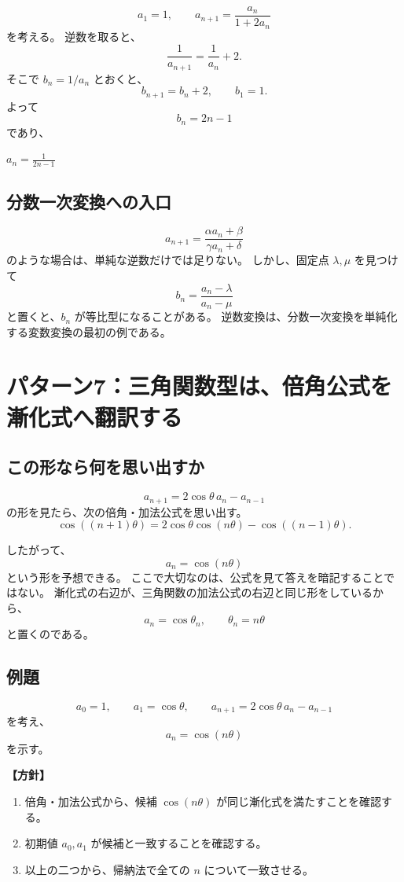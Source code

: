 \[
  a_1=1,\qquad
  a_{n+1}=\frac{a_n}{1+2a_n}
\]
を考える。
逆数を取ると、
\[
  \frac1{a_{n+1}}
  =\frac1{a_n}+2.
\]
そこで $b_n=1/a_n$ とおくと、
\[
  b_{n+1}=b_n+2,\qquad b_1=1.
\]
よって
\[
  b_n=2n-1
\]
であり、
\begin{mdquote}
  $a_n=\frac1{2n-1}$
\end{mdquote}

\subsection{分数一次変換への入口}

\[
  a_{n+1}=\frac{\alpha a_n+\beta}{\gamma a_n+\delta}
\]
のような場合は、単純な逆数だけでは足りない。
しかし、固定点 $\lambda,\mu$ を見つけて
\[
  b_n=\frac{a_n-\lambda}{a_n-\mu}
\]
と置くと、$b_n$ が等比型になることがある。
逆数変換は、分数一次変換を単純化する変数変換の最初の例である。

\section{パターン7：三角関数型は、倍角公式を漸化式へ翻訳する}

\subsection{この形なら何を思い出すか}

\[
  a_{n+1}=2\cos\theta\,a_n-a_{n-1}
\]
の形を見たら、次の倍角・加法公式を思い出す。
\[
  \cos((n+1)\theta)
  =2\cos\theta\cos(n\theta)-\cos((n-1)\theta).
\]

したがって、
\[
  a_n=\cos(n\theta)
\]
という形を予想できる。
ここで大切なのは、公式を見て答えを暗記することではない。
漸化式の右辺が、三角関数の加法公式の右辺と同じ形をしているから、
\[
  a_n=\cos\theta_n,\qquad \theta_n=n\theta
\]
と置くのである。

\subsection{例題}

\[
  a_0=1,\qquad a_1=\cos\theta,\qquad
  a_{n+1}=2\cos\theta\,a_n-a_{n-1}
\]
を考え、
\[
  a_n=\cos(n\theta)
\]
を示す。

\noindent\textbf{【方針】}

\begin{enumerate}
  \item 倍角・加法公式から、候補 $\cos(n\theta)$ が同じ漸化式を満たすことを確認する。
  \item 初期値 $a_0,a_1$ が候補と一致することを確認する。
  \item 以上の二つから、帰納法で全ての $n$ について一致させる。
\end{enumerate}

